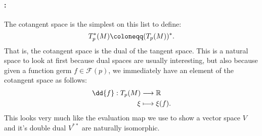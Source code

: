 \documentclass{homework}
\begin{document}
\paragraph{:} The cotangent space is the simplest on this list to define:
\begin{equation*}
	T_p^*(M) \defeq (T_p(M))^*.
\end{equation*}
That is, the cotangent space is the dual of the tangent space.
This is a natural space to look at first because dual spaces are usually interesting, but also because given a function germ $f\in \mathcal{F}(p)$, we immediately have an element of the cotangent space as follows:
\begin{align*}
	\dd{f}: T_p(M) & \longrightarrow \R \\
	\xi & \longmapsto \xi(f).
\end{align*}
This looks very much like the evaluation map we use to show a vector space $V$ and it's double dual $V^{**}$ are naturally isomorphic.
\end{document}

